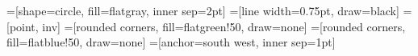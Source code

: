 =[shape=circle, fill=flatgray, inner sep=2pt]
=[line width=0.75pt, draw=black]
=[point, inv]
=[rounded corners, fill=flatgreen!50, draw=none]
=[rounded corners, fill=flatblue!50, draw=none]
=[anchor=south west, inner sep=1pt]

\newcommand{\quadi}[5]{{
  \newcommand{\argstyle}{#1}
  \newcommand{\argxmin}{#2}
  \newcommand{\argxmax}{#3}
  \newcommand{\argymin}{#4}
  \newcommand{\argymax}{#5}
  \foreach \x in {0, ..., \argxmax} {
    \foreach \y in {0, ..., \argymax} {
      \node[\argstyle] (\x-\y) at (\x, \y) {};
    }
  }
}}

\newcommand{\quadii}[5]{{
  \newcommand{\argstyle}{#1}
  \newcommand{\argxmin}{#2}
  \newcommand{\argxmax}{#3}
  \newcommand{\argymin}{#4}
  \newcommand{\argymax}{#5}
  \foreach \x in {\argxmin, ..., 0} {
    \foreach \y in {0, ..., \argymax} {
      \node[\argstyle] (\x-\y) at (\x, \y) {};
    }
  }
}}

\newcommand{\quadiii}[5]{{
  \newcommand{\argstyle}{#1}
  \newcommand{\argxmin}{#2}
  \newcommand{\argxmax}{#3}
  \newcommand{\argymin}{#4}
  \newcommand{\argymax}{#5}
  \foreach \x in {\argxmin, ..., 0} {
    \foreach \y in {\argymin, ..., 0} {
      \node[\argstyle] (\x-\y) at (\x, \y) {};
    }
  }
}}

\newcommand{\quadiv}[5]{{
  \newcommand{\argstyle}{#1}
  \newcommand{\argxmin}{#2}
  \newcommand{\argxmax}{#3}
  \newcommand{\argymin}{#4}
  \newcommand{\argymax}{#5}
  \foreach \x in {0, ..., \argxmax} {
    \foreach \y in {\argymin, ..., 0} {
      \node[\argstyle] (\x-\y) at (\x, \y) {};
    }
  }
}}

\newcommand{\xmin}{-2}
\newcommand{\xmax}{2}
\newcommand{\ymin}{-2}
\newcommand{\ymax}{2}

